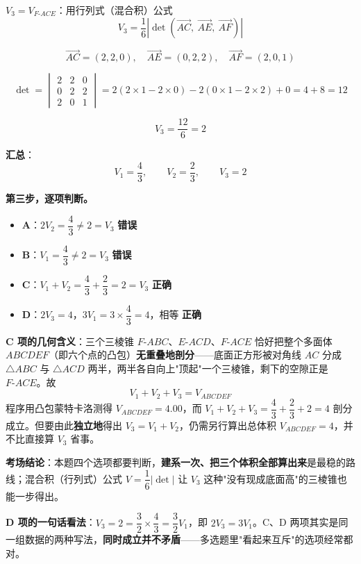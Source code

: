 \begin{answer}
\textbf{$V_3=V_{F\text{-}ACE}$}：用行列式（混合积）公式
\nopagebreak[4]
\[V_3=\frac16\left|\det\left(\overrightarrow{AC},\ \overrightarrow{AE},\ \overrightarrow{AF}\right)\right|\]

\nopagebreak[4]
\[\overrightarrow{AC}=(2,2,0),\quad\overrightarrow{AE}=(0,2,2),\quad\overrightarrow{AF}=(2,0,1)\]

\nopagebreak[4]
\[\det=\begin{vmatrix}2&2&0\\0&2&2\\2&0&1\end{vmatrix}=2(2\times1-2\times0)-2(0\times1-2\times2)+0=4+8=12\]

\nopagebreak[4]
\[V_3=\frac{12}6=2\]

\textbf{汇总}：
\nopagebreak[4]
\[V_1=\frac43,\qquad V_2=\frac23,\qquad V_3=2\]

\textbf{第三步，逐项判断。}

\begin{itemize}
\item \textbf{A}：$2V_2=\dfrac43\ne2=V_3$  \textbf{错误}
\item \textbf{B}：$V_1=\dfrac43\ne2=V_3$  \textbf{错误}
\item \textbf{C}：$V_1+V_2=\dfrac43+\dfrac23=2=V_3$  \textbf{正确}
\item \textbf{D}：$2V_3=4$，$3V_1=3\times\dfrac43=4$，相等  \textbf{正确}
\end{itemize}

\begin{gktip}
\textbf{C 项的几何含义}：三个三棱锥 $F\text{-}ABC$、$E\text{-}ACD$、$F\text{-}ACE$ 恰好把整个多面体 $ABCDEF$（即六个点的凸包）\textbf{无重叠地剖分}——底面正方形被对角线 $AC$ 分成 $\triangle ABC$ 与 $\triangle ACD$ 两半，两半各自向上"顶起"一个三棱锥，剩下的空隙正是 $F\text{-}ACE$。故
\nopagebreak[4]
\[V_1+V_2+V_3=V_{ABCDEF}\]
程序用凸包蒙特卡洛测得 $V_{ABCDEF}=4.00$，而 $V_1+V_2+V_3=\dfrac43+\dfrac23+2=4$  剖分成立。但要由此\textbf{独立地}得出 $V_3=V_1+V_2$，仍需另行算出总体积 $V_{ABCDEF}=4$，并不比直接算 $V_3$ 省事。

\textbf{考场结论}：本题四个选项都要判断，\textbf{建系一次、把三个体积全部算出来}是最稳的路线；混合积（行列式）公式 $V=\dfrac16\left|\det\right|$ 让 $V_3$ 这种"没有现成底面高"的三棱锥也能一步得出。

\textbf{D 项的一句话看法}：$V_3=2=\dfrac32\times\dfrac43=\dfrac32V_1$，即 $2V_3=3V_1$。C、D 两项其实是同一组数据的两种写法，\textbf{同时成立并不矛盾}——多选题里"看起来互斥"的选项经常都对。
\end{gktip}


\par\medskip

\end{answer}

